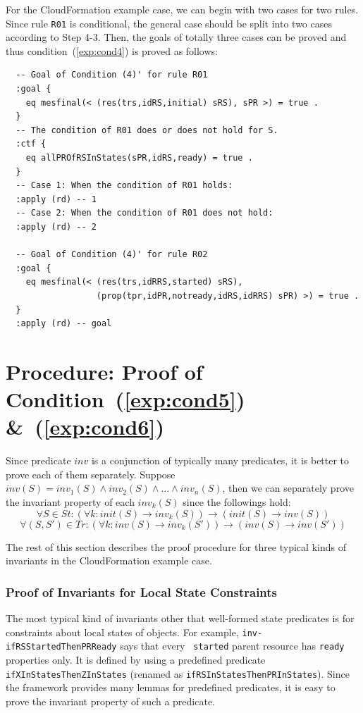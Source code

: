 \documentclass[12pt]{report}
\newcommand{\ra}{\rightarrow}
\begin{document}
For the CloudFormation example case, we can begin with two cases for
two rules. Since rule {\tt R01} is conditional, the general case
should be split into two cases according to Step 4-3. Then, the goals
of totally three cases can be proved and thus condition~(\ref{exp:cond4}) is proved
as follows:
\small
\begin{verbatim}
  -- Goal of Condition (4)' for rule R01
  :goal {
    eq mesfinal(< (res(trs,idRS,initial) sRS), sPR >) = true .
  }
  -- The condition of R01 does or does not hold for S.
  :ctf {
    eq allPROfRSInStates(sPR,idRS,ready) = true .
  }
  -- Case 1: When the condition of R01 holds:
  :apply (rd) -- 1
  -- Case 2: When the condition of R01 does not hold:
  :apply (rd) -- 2

  -- Goal of Condition (4)' for rule R02
  :goal {
    eq mesfinal(< (res(trs,idRRS,started) sRS),
                  (prop(tpr,idPR,notready,idRS,idRRS) sPR) >) = true .
  }
  :apply (rd) -- goal
\end{verbatim}
\normalsize

\section{Procedure: Proof of Condition~(\ref{exp:cond5}) \&~(\ref{exp:cond6})}
\label{sec:invariant}
Since predicate $inv$ is a conjunction of typically many predicates, it is
better to prove each of them separately. Suppose $inv(S) =
inv_1(S)\land inv_2(S)\land\dots\land inv_n(S)$, then we can
separately prove the invariant property of each $inv_k(S)$ since the
followings hold:
\[\forall S\in St: (\forall k:init(S)\ra inv_k(S))\ra(init(S)\ra inv(S))\]
\[\forall (S,S')\in \mathit{Tr}: (\forall k:inv(S)\ra inv_k(S'))\ra(inv(S)\ra inv(S'))\]

\vspace{0.3cm}
The rest of this section describes the proof procedure for three
typical kinds of invariants in the CloudFormation example case.

\subsubsection*{Proof of Invariants for Local State Constraints}
The most typical kind of invariants other that well-formed state
predicates is for constraints about local states of objects.  For
example, {\tt inv-ifRSStartedThenPRReady} says that every {\tt
  started} parent resource has {\tt ready} properties only.  It is
defined by using a predefined predicate {\tt ifXInStatesThenZInStates}
(renamed as {\tt ifRSInStatesThenPRInStates}). Since the framework
provides many lemmas for predefined predicates, it is easy to
prove the invariant property of such a predicate. \\
\end{document}
